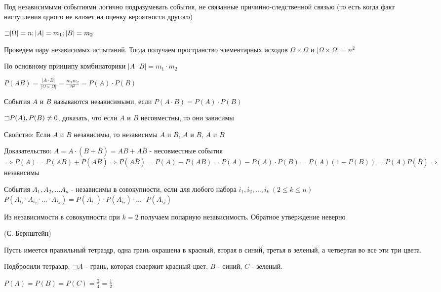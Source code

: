\documentclass[12pt]{article}
\begin{document}
    Под независимыми событиями логично подразумевать события, не связанные причинно-следственной связью (то есть когда факт наступления одного не влияет на оценку вероятности другого)

    $\mathord{\sqsupset} |\Omega| = n; |A| = m_1; |B| = m_2$

    Проведем пару независимых испытаний. Тогда получаем пространство элементарных исходов $\Omega \times \Omega$ и $|\Omega \times \Omega| = n^2$

    По основному принципу комбинаторики $|A \cdot B| = m_1 \cdot m_2$

    $P(AB) = \frac{|A \cdot B|}{|\Omega \times \Omega|} = \frac{m_1 m_2}{n^2} = P(A) \cdot P(B)$

    \hypertarget{independantevents}{}

    \Def События $A$ и $B$ называются независимыми, если $P(A \cdot B) = P(A) \cdot P(B)$

    \Lab $\mathord{\sqsupset} P(A), P(B) \neq 0$, доказать, что если $A$ и $B$ несовместны, то они зависимы

    Свойство: Если $A$ и $B$ независимы, то независимы $\overline{A}$ и $\overline{B}$, $A$ и $\overline{B}$, $\overline{A}$ и $B$

    Доказательство: $A = A \cdot (B + \overline{B}) = AB + A\overline{B}$ - несовместные события $\Longrightarrow P(A) = P(AB) + P(A\overline{B}) \Longrightarrow P(A\overline{B}) = P(A) - P(AB) =
    P(A) - P(A) \cdot P(B) = P(A) (1 - P(B)) = P(A) P(\overline{B}) \Longrightarrow$ независимы

    \Def События $A_1, A_2, \dots A_n$ - независимы в совокупности, если для любого набора $i_1, i_2, \dots, i_k \ (2 \leq k \leq n)$
    $P(A_{i_1} \cdot A_{i_2} \cdot \dots \cdot A_{i_k}) = P(A_{i_1}) \cdot P(A_{i_2}) \cdot \dots \cdot P(A_{i_k})$

    \Nota Из независимости в совокупности при $k = 2$ получаем попарную независимость. Обратное утверждение неверно

    \hypertarget{bernshteinsexample}{}

    \Ex (С. Бернштейн)

    Пусть имеется правильный тетраэдр, одна грань окрашена в красный, вторая в синий, третья в зеленый, а четвертая во все эти три цвета.

    Подбросили тетраэдр, $\mathord{\sqsupset} A$ - грань, которая содержит красный цвет, $B$ - синий, $C$ - зеленый.

    $P(A) = P(B) = P(C) = \frac{2}{4} = \frac{1}{2}$
\end{document}
